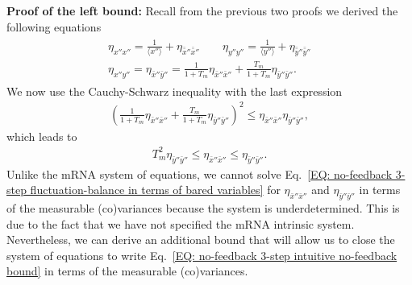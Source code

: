 \documentclass[%
 reprint,prx,
superscriptaddress,
%
%
%
%
%
%
%
%
%
 amsmath,amssymb,
 aps,
%
%
%
%
%
%
]{revtex4-2}
\begin{document}
{\noindent \textbf{Proof of the left bound:} Recall from the previous two proofs we derived the following equations
\begin{align}
\begin{split}
 \eta_{x''x''} = \frac{1}{\langle x'' \rangle} +\eta_{\bar{\bar{x}}''\bar{\bar{x}}''}  \quad\quad 
 \eta_{y''y''} = \frac{1}{\langle y'' \rangle} +\eta_{\bar{\bar{y}}''\bar{\bar{y}}''}  \\
 \eta_{x''y''} = \eta_{\bar{x}''\bar{y}''} = \frac{1}{1+T_{m}}\eta_{\bar{x}''\bar{x}''} + \frac{T_{m}}{1+T_{m}}\eta_{\bar{y}''\bar{y}''}.
\end{split}
 \label{EQ: no-feedback 3-step fluctuation-balance in terms of bared variables}
\end{align}
We now use the Cauchy-Schwarz inequality with the last expression
\begin{align*}
 \left(\frac{1}{1+T_{m}}\eta_{\bar{x}''\bar{x}''} + \frac{T_{m}}{1+T_{m}}\eta_{\bar{y}''\bar{y}''}\right)^{2} \leq \eta_{\bar{x}''\bar{x}''}\eta_{\bar{y}''\bar{y}''} ,
\end{align*}
which leads to 
\begin{align}
 T_{m}^{2}\eta_{\bar{y}''\bar{y}''} \leq \eta_{\bar{x}''\bar{x}''} \leq \eta_{\bar{y}''\bar{y}''}  .
 \label{EQ: no-feedback 3-step intuitive no-feedback bound}
\end{align}
Unlike the mRNA system of equations, we cannot solve Eq.~\eqref{EQ: no-feedback 3-step fluctuation-balance in terms of bared variables} for $\eta_{\bar{x}''\bar{x}''} $ and $\eta_{\bar{y}''\bar{y}''}$ in terms of the measurable (co)variances 
because the system is underdetermined. This is due to the fact that we have not specified the mRNA intrinsic system. 
Nevertheless, we can derive an additional bound that will allow us to close the system of equations to write Eq.~\eqref{EQ: no-feedback 3-step intuitive no-feedback bound}
in terms of the measurable (co)variances. \\

}
\end{document}
